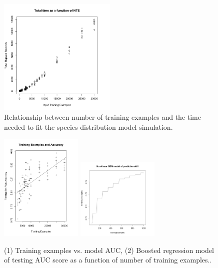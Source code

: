 \documentclass[a4paper]{article}
\begin{document}
\begin{figure}
\centering
\includegraphics[width=0.5\textwidth]{nte_time.png}
\caption{Relationship between number of training examples and the time needed to fit the species distribution model simulation.}\label{fig:nte_time}
\end{figure}

\begin{figure}
\centering
\includegraphics[width=0.35\textwidth]{training_vs_ac_abline.png}
\includegraphics[width=0.35\textwidth]{nte_accuracy_gbm.png}
\caption{(1) Training examples vs. model AUC, (2) Boosted regression model of testing AUC score as a function of number of training examples..}\label{fig:acc_model}
\end{figure}
\end{document}
